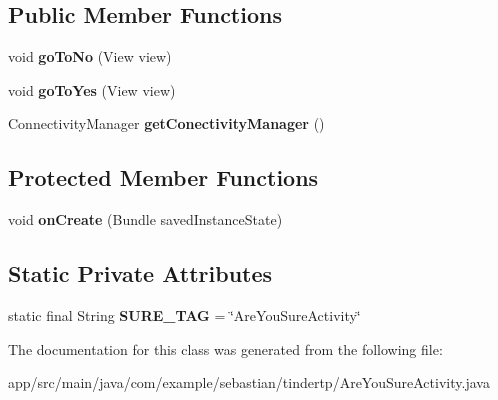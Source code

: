 \subsection*{Public Member Functions}
\begin{DoxyCompactItemize}
\item 
void {\bfseries go\+To\+No} (View view)\hypertarget{classcom_1_1example_1_1sebastian_1_1tindertp_1_1AreYouSureActivity_addbc55b02c35a1a6f926dfc4056c6072}{}\label{classcom_1_1example_1_1sebastian_1_1tindertp_1_1AreYouSureActivity_addbc55b02c35a1a6f926dfc4056c6072}

\item 
void {\bfseries go\+To\+Yes} (View view)\hypertarget{classcom_1_1example_1_1sebastian_1_1tindertp_1_1AreYouSureActivity_a18252af772c972d11483880dcd6327ee}{}\label{classcom_1_1example_1_1sebastian_1_1tindertp_1_1AreYouSureActivity_a18252af772c972d11483880dcd6327ee}

\item 
Connectivity\+Manager {\bfseries get\+Conectivity\+Manager} ()\hypertarget{classcom_1_1example_1_1sebastian_1_1tindertp_1_1AreYouSureActivity_ad6f811ed896ab2a9645375b117d62503}{}\label{classcom_1_1example_1_1sebastian_1_1tindertp_1_1AreYouSureActivity_ad6f811ed896ab2a9645375b117d62503}

\end{DoxyCompactItemize}
\subsection*{Protected Member Functions}
\begin{DoxyCompactItemize}
\item 
void {\bfseries on\+Create} (Bundle saved\+Instance\+State)\hypertarget{classcom_1_1example_1_1sebastian_1_1tindertp_1_1AreYouSureActivity_ae86d975c4bede1d00f6190c446f61991}{}\label{classcom_1_1example_1_1sebastian_1_1tindertp_1_1AreYouSureActivity_ae86d975c4bede1d00f6190c446f61991}

\end{DoxyCompactItemize}
\subsection*{Static Private Attributes}
\begin{DoxyCompactItemize}
\item 
static final String {\bfseries S\+U\+R\+E\+\_\+\+T\+AG} = \char`\"{}Are\+You\+Sure\+Activity\char`\"{}\hypertarget{classcom_1_1example_1_1sebastian_1_1tindertp_1_1AreYouSureActivity_ab176b9c7b96d369a92002e64400f6db8}{}\label{classcom_1_1example_1_1sebastian_1_1tindertp_1_1AreYouSureActivity_ab176b9c7b96d369a92002e64400f6db8}

\end{DoxyCompactItemize}


The documentation for this class was generated from the following file\+:\begin{DoxyCompactItemize}
\item 
app/src/main/java/com/example/sebastian/tindertp/Are\+You\+Sure\+Activity.\+java\end{DoxyCompactItemize}
